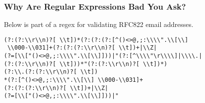 \documentclass{beamer}
\begin{document}

\begin{frame}[fragile]
\frametitle{Why Are Regular Expressions Bad You Ask?}
Below is part of a regex for validating RFC822 email addresses.
\begin{verbatim}
(?:(?:\\r\\n)?[ \\t])*(?:(?:(?:[^()<>@,;:\\\\".\\[\\]
 \\000-\\031]+(?:(?:(?:\\r\\n)?[ \\t])+|\\Z|
(?=[\\["()<>@,;:\\\\".\\[\\]]))|"(?:[^\\\\"\r\\\\]|\\\\.|
(?:(?:\\r\\n)?[ \\t]))*"(?:(?:\\r\\n)?[ \\t])*)
(?:\\.(?:(?:\\r\\n)?[ \\t])
*(?:[^()<>@,;:\\\\".\\[\\] \\000-\\031]+
(?:(?:(?:\\r\\n)?[ \\t])+|\\Z|
(?=[\\["()<>@,;:\\\\".\\[\\]]))|"

\end{verbatim}
\end{frame}
\end{document}
